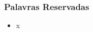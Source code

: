 \documentclass{beamer}
\begin{document}
\begin{frame}
	\frametitle{Palavras Reservadas}
	\begin{itemize}
		\item x
	\end{itemize}	
\end{frame}

\begin{frame}
	\frametitle{}
	\begin{columns}[T] %
		\begin{column}{.50\textwidth}
		\end{column}%
		\hfill%
		\begin{column}{.50\textwidth}
		\end{column}%
	\end{columns}
\end{frame}
\end{document}

